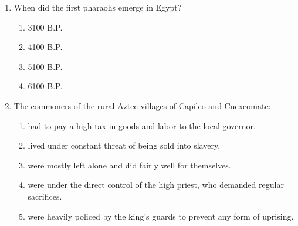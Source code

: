\documentclass[12pt]{article}
\begin{document}
\begin{enumerate}[label=\arabic*.]
\begin{enumerate}[label=(\alph*)]
    \item Maya; AD 400
    \item Zapotec; AD 500
\end{enumerate}
\item When did the first pharaohs emerge in Egypt?
\begin{enumerate}[label=(\alph*)]
    \item 3100 B.P.
    \item 4100 B.P.
    \item 5100 B.P.
    \item 6100 B.P.
\end{enumerate}
\item The commoners of the rural Aztec villages of Capilco and Cuexcomate:
\begin{enumerate}[label=(\alph*)]
    \item had to pay a high tax in goods and labor to the local governor.
    \item lived under constant threat of being sold into slavery.
    \item were mostly left alone and did fairly well for themselves.
    \item were under the direct control of the high priest, who demanded regular sacrifices.
    \item were heavily policed by the king's guards to prevent any form of uprising.
\end{enumerate}
\end{enumerate}
\end{document}
